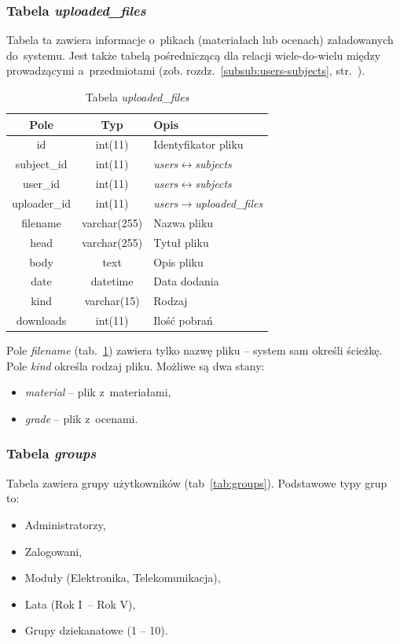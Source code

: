 \documentclass[a4paper,12pt,oneside]{report}
\begin{document}
\subsubsection{Tabela \emph{uploaded\_files}}
\label{subsub:uploaded_files}
Tabela ta zawiera informacje o~plikach (materiałach lub ocenach) załadowanych do~systemu. Jest także tabelą pośredniczącą dla relacji wiele-do-wielu między prowadzącymi a~przedmiotami (zob. rozdz.~\ref{subsub:users-subjects}, str.~\pageref{subsub:users-subjects}).

\begin{table}[h]
  \centering
  \begin{tabular}{|c|c|l|}\hline
  Pole & Typ & Opis \\\hline
  id           & int(11)      & Identyfikator pliku\\
  subject\_id  & int(11)      & \emph{users}$\leftrightarrow$\emph{subjects}\\
  user\_id     & int(11)      & \emph{users}$\leftrightarrow$\emph{subjects}\\
  uploader\_id & int(11)      & \emph{users}$\to$\emph{uploaded\_files}\\
  filename     & varchar(255) & Nazwa pliku \\
  head         & varchar(255) & Tytuł pliku \\
  body         & text         & Opis pliku \\
  date         & datetime     & Data dodania \\
  kind         & varchar(15)  & Rodzaj \\
  downloads    & int(11)      & Ilość pobrań \\\hline
  \end{tabular}
  \caption{Tabela \emph{uploaded\_files}\label{tab:uploaded_files}}
\end{table}

Pole \emph{filename} (tab.~\ref{tab:uploaded_files}) zawiera tylko nazwę pliku -- system sam określi ścieżkę. Pole \emph{kind} określa rodzaj pliku. Możliwe są dwa stany:
\begin{itemize}
  \item \emph{material} -- plik z~materiałami,
  \item \emph{grade} -- plik z~ocenami.
\end{itemize}

\subsubsection{Tabela \emph{groups}}
\label{subsub:groups}
Tabela zawiera grupy użytkowników (tab~\ref{tab:groups}). Podstawowe typy grup to:
  \begin{itemize}
    \item Administratorzy,
    \item Zalogowani,
    \item Moduły (Elektronika, Telekomunikacja),
    \item Lata (Rok I~-- Rok V),
    \item Grupy dziekanatowe (1 -- 10).
  \end{itemize}
\end{document}
